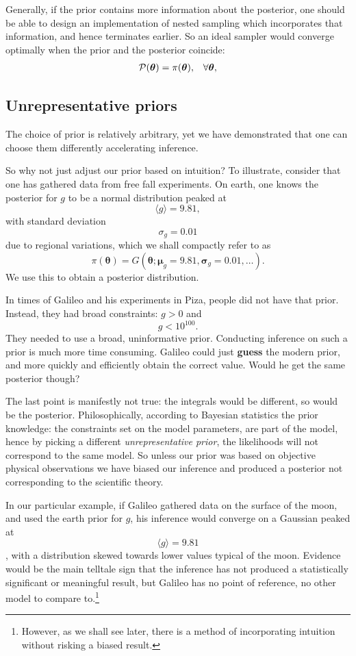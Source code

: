 \documentclass[usenatbib]{mnras}
\begin{document}
Generally, if the prior contains more information about the
posterior, one should be able to design an implementation of nested
sampling which incorporates that information, and hence terminates
earlier.  So an ideal sampler would converge optimally when the
prior and the posterior coincide:
\begin{equation}
\begin{array}{rl} 
{\cal P}(\bm{\theta}) = \pi(\bm{\theta}), & \forall \bm{\theta},
\end{array}
\end{equation}

\subsection{Unrepresentative priors \label{discussion-bias}}
\label{sec:org20c3d14}
The choice of prior is relatively arbitrary, yet we have
demonstrated that one can choose them differently accelerating
inference.

So why not just adjust our prior based on intuition?  To
illustrate, consider that one has gathered data from free fall
experiments. On earth, one knows the posterior for \(g\) to be a
normal distribution peaked at \[\langle g \rangle=9.81,\] with
standard deviation \[\sigma_{g} = 0.01\] due to regional variations,
which we shall compactly refer to as \[\pi(\bm{\theta}) = G(\bm{\theta};\bm{\mu}_{g}=9.81,
   \bm{\sigma}_{g}=0.01, \ldots ).\] We use this to obtain a posterior distribution. 

In times of Galileo and his experiments in Piza, people did not
have that prior. Instead, they had broad constraints: \(g>0\) and
\[g<10^{100}.\] They needed to use a broad, uninformative
prior. Conducting inference on such a prior is much more time
consuming. Galileo could just \textbf{guess} the modern prior, and more
quickly and efficiently obtain the correct value. Would he get the
same posterior though?

The last point is manifestly not true: the integrals would be
different, so would be the posterior. Philosophically, according to
Bayesian statistics the prior knowledge: the constraints set on the
model parameters, are part of the model, hence by picking a
different \emph{unrepresentative prior}, the likelihoods will not
correspond to the same model. So unless our prior was based on
objective physical observations we have biased our inference and
produced a posterior not corresponding to the scientific theory.

In our particular example, if Galileo gathered data on the surface
of the moon, and used the earth prior for \(g\), his inference
would converge on a Gaussian peaked at \[\langle g \rangle=9.81\],
with a distribution skewed towards lower values typical of the
moon. Evidence would be the main telltale sign that the inference
has not produced a statistically significant or meaningful result,
but Galileo has no point of reference, no other model to compare
to.\footnote{However, as we shall see later, there is a method of
incorporating intuition without risking a biased result.}
\end{document}

